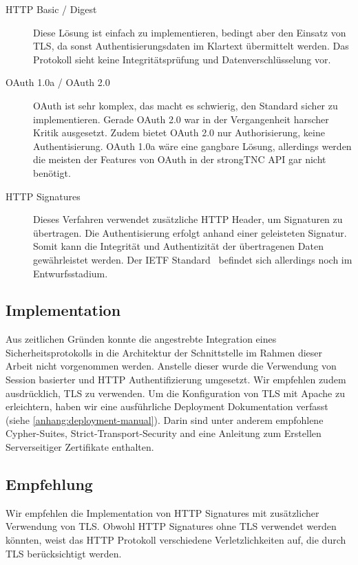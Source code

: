 \begin{description}

\item [HTTP Basic / Digest] Diese Lösung ist einfach zu implementieren, bedingt
aber den Einsatz von TLS, da sonst Authentisierungsdaten im Klartext übermittelt
werden. Das Protokoll sieht keine Integritätsprüfung und Datenverschlüsselung
vor.

\item [OAuth 1.0a / OAuth 2.0] OAuth ist sehr komplex, das macht es schwierig,
den Standard sicher zu implementieren. Gerade OAuth 2.0 war in der Vergangenheit
harscher Kritik ausgesetzt\cite{hammer2012, homakov2013}. Zudem bietet OAuth 2.0
nur Authorisierung, keine Authentisierung. OAuth 1.0a wäre eine gangbare Lösung,
allerdings werden die meisten der Features von OAuth in der strongTNC API gar
nicht benötigt.

\item [HTTP Signatures] Dieses Verfahren verwendet zusätzliche HTTP Header, um
Signaturen zu übertragen. Die Authentisierung erfolgt anhand einer geleisteten
Signatur. Somit kann die Integrität und Authentizität der übertragenen Daten
gewährleistet werden. Der IETF Standard~\cite{httpsignatures2014} befindet sich allerdings noch im
Entwurfsstadium.

\end{description}

\subsection{Implementation} Aus zeitlichen Gründen konnte die angestrebte
Integration eines Sicherheitsprotokolls in die Architektur der Schnittstelle im
Rahmen dieser Arbeit nicht vorgenommen werden. Anstelle dieser wurde die
Verwendung von Session basierter und HTTP Authentifizierung umgesetzt. Wir
empfehlen zudem ausdrücklich, TLS zu verwenden. Um die Konfiguration von TLS mit
Apache zu erleichtern, haben wir eine ausführliche Deployment Dokumentation
verfasst (siehe \ref{anhang:deployment-manual}). Darin sind unter anderem
empfohlene Cypher-Suites, Strict-Transport-Security and eine Anleitung zum
Erstellen Serverseitiger Zertifikate enthalten.

\subsection{Empfehlung} Wir empfehlen die Implementation von HTTP Signatures mit
zusätzlicher Verwendung von TLS. Obwohl HTTP Signatures ohne TLS verwendet
werden könnten, weist das HTTP Protokoll verschiedene Verletzlichkeiten
\cite{httpsecconsiderations2014} auf, die durch TLS berücksichtigt werden.

